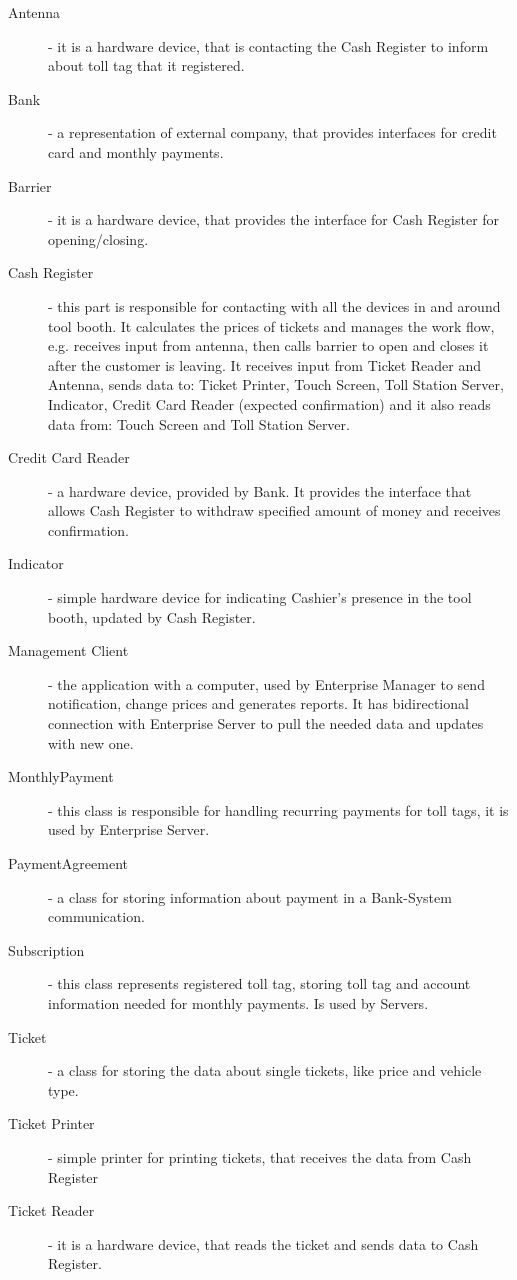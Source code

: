 \begin{description}
\item[Antenna] - it is a hardware device, that is contacting the Cash Register to inform about toll tag that it registered.
\item[Bank] - a representation of external company, that provides interfaces for credit card and monthly payments. 
\item[Barrier] - it is a hardware device, that provides the interface for Cash Register for opening/closing.
\item[Cash Register] - this part is responsible for contacting with all the devices in and around tool booth. It calculates the prices of tickets and manages the work flow, e.g. receives input from antenna, then calls barrier to open and closes it after the customer is leaving. It receives input from Ticket Reader and Antenna, sends data to: Ticket Printer, Touch Screen, Toll Station Server, Indicator, Credit Card Reader (expected confirmation) and it also reads data from: Touch Screen and Toll Station Server.
\item[Credit Card Reader] - a hardware device, provided by Bank. It provides the interface that allows Cash Register to withdraw specified amount of money and receives confirmation.
\item[Indicator] - simple hardware device for indicating Cashier's presence in the tool booth, updated by Cash Register.
\item[Management Client] - the application with a computer, used by Enterprise Manager to send notification, change prices and generates reports. It has bidirectional connection with Enterprise Server to pull the needed data and updates with new one.
\item[MonthlyPayment] - this class is responsible for handling recurring payments for toll tags, it is used by Enterprise Server.
\item[PaymentAgreement] - a class for storing information about payment in a Bank-System communication.
\item[Subscription] - this class represents registered toll tag, storing toll tag and account information needed for monthly payments. Is used by Servers.
\item[Ticket] - a class for storing the data about single tickets, like price and vehicle type.  
\item[Ticket Printer] - simple printer for printing tickets, that receives the data from Cash Register
\item[Ticket Reader] - it is a hardware device, that reads the ticket and sends data to Cash Register.

\end{description}
